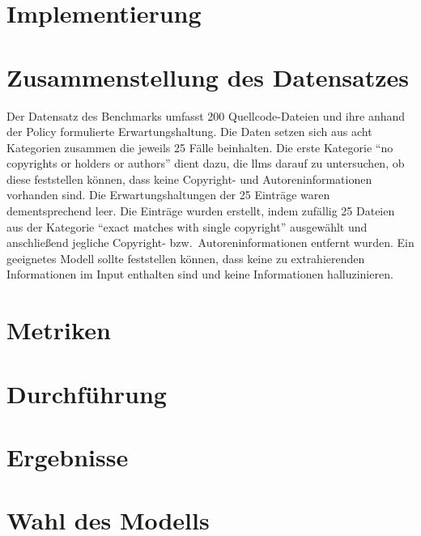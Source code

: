 \section{Implementierung}\label{sec:benchmark-implementierung}

\section{Zusammenstellung des Datensatzes}\label{sec:datensatz-benchmark}

Der Datensatz des Benchmarks umfasst 200 Quellcode-Dateien und ihre anhand der Policy formulierte Erwartungshaltung.
Die Daten setzen sich aus acht Kategorien zusammen die jeweils 25 Fälle beinhalten.
Die erste Kategorie \enquote{no copyrights or holders or authors} dient dazu, die \glspl{llm} darauf zu untersuchen, ob diese feststellen können, dass keine Copyright- und Autoreninformationen vorhanden sind.
Die Erwartungshaltungen der 25 Einträge waren dementsprechend leer.
Die Einträge wurden erstellt, indem zufällig 25 Dateien aus der Kategorie \enquote{exact matches with single copyright} ausgewählt und anschließend jegliche Copyright- bzw.\ Autoreninformationen entfernt wurden.
Ein geeignetes Modell sollte feststellen können, dass keine zu extrahierenden Informationen im Input enthalten sind und keine Informationen halluzinieren.

\section{Metriken}\label{sec:metriken-benchmark}

\section{Durchführung}\label{sec:durchfuhrung-benchmark}

\section{Ergebnisse}\label{sec:ergebnisse-benchmark}

\section{Wahl des Modells}\label{sec:auswahl-modell-benchmark}